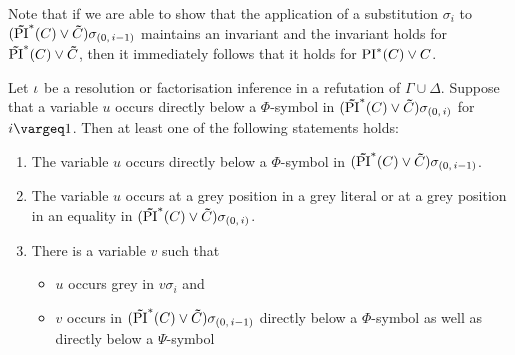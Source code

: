 \documentclass[%
	draft=false,%
	numbers=noendperiod,%
	11pt,%
	a4paper,%
	oneside,%
	openany,%
]{memoir}
\begin{document}
\newcommand{\inv}{\ensuremath{\PIstarnosigma(C)\lor \nosigma{C}}}
\newcommand{\invp}{\ensuremath{(\inv)}}


Note that if we are able to show that the application of a substitution $\sigma_i$ to $\invp\sigmazmi$ maintains an invariant and the invariant holds for $\inv$, then it immediately follows that it holds for $\operatorname{PI}^*(C) \lor C$. 



\begin{lemma}
	\label{lemma:var_below_phi_symbol}
	Let $\iota$ be a resolution or factorisation inference in a refutation of $\Gamma\cup\Delta$.
	Suppose that a variable $u$ occurs directly below a $\Phi$-symbol in $\invp\sigmazi$ for $i\vargeq 1$.
	Then at least one of the following statements holds:
	\begin{enumerate}
		\item
			\label{14_1}
			The variable $u$ occurs directly below a $\Phi$-symbol in $\invp\sigmazmi$.

		\item
			\label{14_5}
			The variable $u$ occurs at a grey position in a grey literal or at a grey position in an equality in $\invp\sigmazi$.

		\item 
			\label{14_2}
			There is a variable $v$ such that 
			{
				\renewcommand{\labelitemi}{\textendash}
				\begin{itemize}
					\item $u$ occurs grey in $v\sigma_i$ and
					\item $v$ occurs in $\invp\sigmazmi$ directly below a $\Phi$-symbol as well as directly below a $\Psi$-symbol
				\end{itemize}
			}

	\end{enumerate}
\end{lemma}
\end{document}
